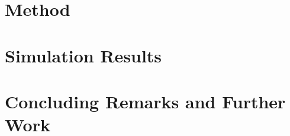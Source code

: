 \documentclass[runningheads]{llncs}
\begin{document}
\section{Method}
\section{Simulation Results}
\section{Concluding Remarks and Further Work}  
%
%
%
%
\end{document}
